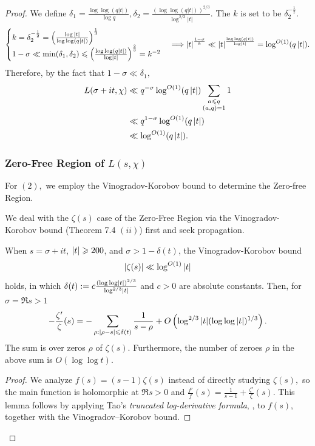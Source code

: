 \begin{proof}
We define $\delta_1 = \frac{\log\log(q|t|)}{\log q}, \delta_2 =  \frac{(\log\log(q|t|))^{2/3}}{\log^{2/3} |t|}.$ The $k$ is set to be $\delta_2^{-\frac{1}{2}}.$ 
\begin{equation*}
    \begin{cases}
        k = \delta_2^{-\frac{1}{2}} = \left( \frac{\log |t|}{\log\log (q|t|)} \right)^\frac{1}{3} \\
        1 - \sigma \ll \min(\delta_1, \delta_2) \leqslant \left( \frac{\log \log (q\left\lvert t \right\rvert)}{\log \left\lvert t \right\rvert} \right)^\frac{2}{3} = k^{-2}
    \end{cases} \Longrightarrow \left\lvert t \right\rvert^\frac{1-\sigma}{k} \ll \left\lvert t \right\rvert^\frac{\log \log (q\left\lvert t \right\rvert)}{\log \left\lvert t \right\rvert} = \log^{O(1)} (q\left\lvert t \right\rvert).
\end{equation*}
Therefore, by the fact that $1-\sigma \ll \delta_1,$
\begin{align*}
    L(\sigma + it, \chi) &\ll q^{-\sigma} \log^{O(1)}(q\left\lvert t \right\rvert) \sum_{\substack{a \leqslant q \\ (a, q) = 1}} 1 \\
    &\ll q^{1-\sigma} \log^{O(1)}(q\left\lvert t \right\rvert) \\
    &\ll \log^{O(1)}(q\left\lvert t \right\rvert).
\end{align*}

\subsubsection{Zero-Free Region of $L(s, \chi)$}
For $(2),$ we employ the Vinogradov-Korobov bound to determine the Zero-free Region.

We deal with the $\zeta(s)$ case of the Zero-Free Region via the Vinogradov-Korobov bound (Theorem 7.4 $(ii)$) first and seek propagation.

\begin{lemma}
    When $s = \sigma + it$, $|t| \geqslant 200$, and $\sigma > 1 - \delta(t)$, the Vinogradov-Korobov bound $$\left\lvert \zeta(s) \right\rvert \ll \log^{O(1)} \left\lvert t \right\rvert$$ holds, in which $\delta(t) := c\frac{(\log\log \left\lvert t \right\rvert)^{2/3}}{\log^{2/3} \left\lvert t \right\rvert}$ and $c > 0$ are absolute constants. Then, for $\sigma = \Re s > 1$
    \begin{equation}
        -\frac{\zeta'}{\zeta}(s) = -\sum_{\rho: |\rho - s| \leqslant \delta(t)} \frac{1}{s - \rho} + O\left( \log^{2/3} |t| (\log \log |t|)^{1/3} \right).
    \end{equation}
    The sum is over zeros $\rho$ of $\zeta(s)$. Furthermore, the number of zeroes $\rho$ in the above sum is $O(\log \log t)$.
\end{lemma}
\begin{proof}
We analyze $f(s) = (s-1)\zeta(s)$ instead of directly studying $\zeta(s),$ so the main function is holomorphic at $\Re s > 0$ and $\frac{f'}{f}(s) = \frac{1}{s-1} + \frac{\zeta'}{\zeta}(s).$ This lemma follows by applying Tao’s \textit{truncated log-derivative formula}, \cite[Proposition.~19]{Tao254ANotes2}, to $f(s)$, together with the Vinogradov–Korobov bound.


\end{proof}
\end{proof}
